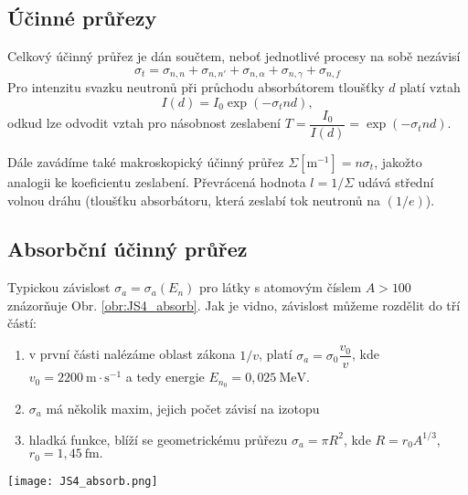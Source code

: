 \documentclass[../../main.tex]{subfiles}
\begin{document}
\subsection{Účinné průřezy}

Celkový účinný průřez je dán součtem, neboť jednotlivé procesy na sobě nezávisí
\begin{equation}
\sigma_t = \sigma_{n,n} + \sigma_{n,n'} + \sigma_{n,\alpha} + \sigma_{n,\gamma} + \sigma_{n,f}
\end{equation}
Pro intenzitu svazku neutronů při průchodu absorbátorem tloušťky $d$ platí vztah
\begin{equation}
I(d) = I_0 \exp (- \sigma_t n d),
\end{equation}
odkud lze odvodit vztah pro násobnost zeslabení $T = \dfrac{I_0}{I(d)} = \exp (- \sigma_t n d)$.

Dále zavádíme také makroskopický účinný průřez $\Sigma [\mathrm{m^{-1}}] = n \sigma_t$, jakožto analogii ke koeficientu zeslabení. Převrácená hodnota $l = 1 / \Sigma$ udává střední volnou dráhu (tloušťku absorbátoru, která zeslabí tok neutronů na $(1/e)$).

\subsection{Absorbční účinný průřez}

Typickou závislost $\sigma_a = \sigma_a (E_n)$ pro látky s atomovým číslem $A > 100$ znázorňuje Obr. \ref{obr:JS4_absorb}. Jak je vidno, závislost můžeme rozdělit do tří částí:
\renewcommand{\theenumi}{\Roman{enumi}}
\begin{enumerate}
	\item v první části nalézáme oblast zákona $1/v$, platí $\sigma_a = \sigma_0 \dfrac{v_0}{v}$, kde $v_0 = 2200 ~\mathrm{m \cdotp s^{-1}}$ a tedy energie $E_{n_0} = 0,025 ~\mathrm{MeV}$.
	\item $\sigma_a$ má několik maxim, jejich počet závisí na izotopu
	\item hladká funkce, blíží se geometrickému průřezu $\sigma_a = \pi R^2$, kde $R= r_0 A^{1/3}$, $r_0 = 1,45 ~\mathrm{fm}.$ 	
\end{enumerate}	
\renewcommand{\theenumi}{\arabic{enumi}}

\begin{center}
	\texttt{[image: JS4\_absorb.png]}
\end{center}	
\end{document}
